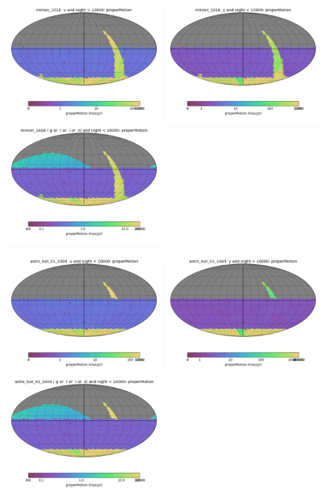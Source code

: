 \begin{figure}[ht]
  \begin{center}
  \includegraphics[width=2.0in]{./figs/milkyway/astromPanels/MW_Astrom_pmError_Baseline_u_map.png}
  \includegraphics[width=2.0in]{./figs/milkyway/astromPanels/MW_Astrom_pmError_Baseline_y_map.png}
  \includegraphics[width=2.0in]{./figs/milkyway/astromPanels/MW_Astrom_pmError_Baseline_10y_map.png}
  \end{center}
  \begin{center}
  \includegraphics[width=2.0in]{./figs/milkyway/astromPanels/MW_Astrom_pmError_wfdPlane_u_map.png}
  \includegraphics[width=2.0in]{./figs/milkyway/astromPanels/MW_Astrom_pmError_wfdPlane_y_map.png}
  \includegraphics[width=2.0in]{./figs/milkyway/astromPanels/MW_Astrom_pmError_wfdPlane_10y_map.png}
  \end{center}


\end{figure}
